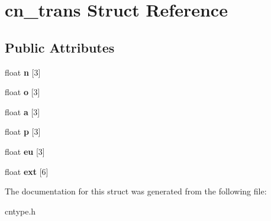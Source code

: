 \hypertarget{structcn__trans}{\section{cn\-\_\-trans Struct Reference}
\label{structcn__trans}
}
\subsection*{Public Attributes}
\begin{DoxyCompactItemize}
\item 
\hypertarget{structcn__trans_a920f6866c0dce7bf757d0407bf34cea1}{float {\bfseries n} \mbox{[}3\mbox{]}}\label{structcn__trans_a920f6866c0dce7bf757d0407bf34cea1}

\item 
\hypertarget{structcn__trans_aca4c310fdb527c51acbeb1bdcab5a0c9}{float {\bfseries o} \mbox{[}3\mbox{]}}\label{structcn__trans_aca4c310fdb527c51acbeb1bdcab5a0c9}

\item 
\hypertarget{structcn__trans_a65deac3f3845c844ce1c8b199f419e44}{float {\bfseries a} \mbox{[}3\mbox{]}}\label{structcn__trans_a65deac3f3845c844ce1c8b199f419e44}

\item 
\hypertarget{structcn__trans_adab5b011307b1be3bc1d04e5631e5507}{float {\bfseries p} \mbox{[}3\mbox{]}}\label{structcn__trans_adab5b011307b1be3bc1d04e5631e5507}

\item 
\hypertarget{structcn__trans_a7299e3dedc3a520e751854fab753112b}{float {\bfseries eu} \mbox{[}3\mbox{]}}\label{structcn__trans_a7299e3dedc3a520e751854fab753112b}

\item 
\hypertarget{structcn__trans_a13b87d36f3637f9352b4531f1a09272f}{float {\bfseries ext} \mbox{[}6\mbox{]}}\label{structcn__trans_a13b87d36f3637f9352b4531f1a09272f}

\end{DoxyCompactItemize}


The documentation for this struct was generated from the following file\-:\begin{DoxyCompactItemize}
\item 
cntype.\-h\end{DoxyCompactItemize}
